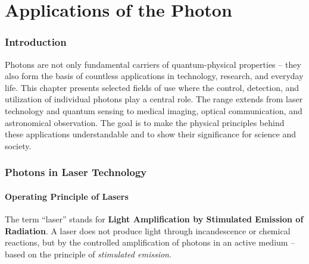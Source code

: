 \chapter{Applications of the Photon}

\setcounter{section}{6}
\setcounter{subsection}{0}
\setcounter{subsubsection}{1}
\setcounter{secnumdepth}{3}

\subsection{Introduction}

Photons are not only fundamental carriers of quantum-physical properties – they also form the basis of countless applications in technology, research, and everyday life.  
This chapter presents selected fields of use where the control, detection, and utilization of individual photons play a central role.  
The range extends from laser technology and quantum sensing to medical imaging, optical communication, and astronomical observation.  
The goal is to make the physical principles behind these applications understandable and to show their significance for science and society.

\subsection{Photons in Laser Technology}
\subsubsection{Operating Principle of Lasers}

The term “laser” stands for \textbf{Light Amplification by Stimulated Emission of Radiation}.  
A laser does not produce light through incandescence or chemical reactions, but by the controlled amplification of photons in an active medium – based on the principle of \emph{stimulated emission}.

